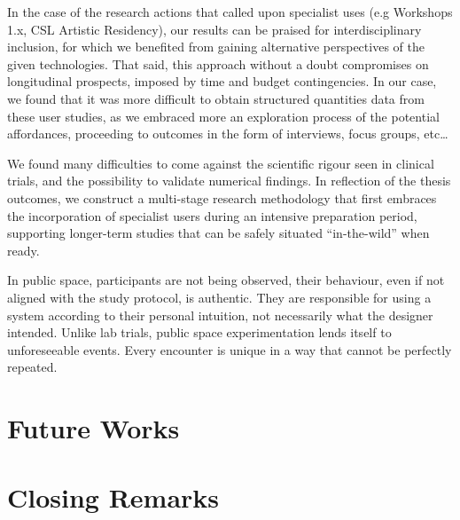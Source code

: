 In the case of the research actions that called upon specialist uses (e.g Workshops 1.x, CSL Artistic Residency), our results can be praised for interdisciplinary inclusion, for which we benefited from gaining alternative perspectives of the given technologies. That said, this approach without a doubt compromises on longitudinal prospects, imposed by time and budget contingencies. In our case, we found that it was more difficult to obtain structured quantities data from these user studies, as we embraced more an exploration process of the potential affordances, proceeding to outcomes in the form of interviews, focus groups, etc…

We found many difficulties to come against the scientific rigour seen in clinical trials, and the possibility to validate numerical findings. In reflection of the thesis outcomes, we construct a multi-stage research methodology that first embraces the incorporation of specialist users during an intensive preparation period, supporting longer-term studies that can be safely situated “in-the-wild” when ready.

In public space, participants are not being observed, their behaviour, even if not aligned with the study protocol, is authentic. They are responsible for using a system according to their personal intuition, not necessarily what the designer intended. Unlike lab trials, public space experimentation lends itself to unforeseeable events. Every encounter is unique in a way that cannot be perfectly repeated. 

\section{Future Works}

\section{Closing Remarks}




